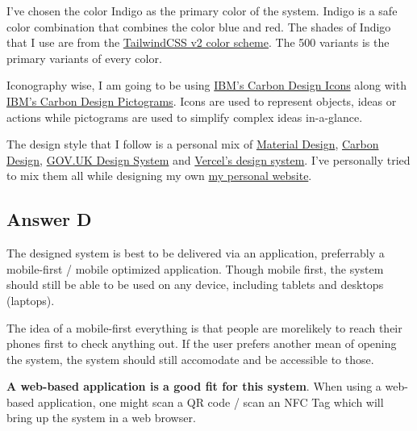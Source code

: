 \documentclass[
  11pt, %
]{assignment}
\begin{document}
I've chosen the color Indigo as the primary color of the system. Indigo is a safe color combination that combines the color blue and red. The shades of Indigo that I use are from the \href{https://tailwindcss.com/docs/customizing-colors}{TailwindCSS v2 color scheme}. The 500 variants is the primary variants of every color.

Iconography wise, I am going to be using \href{https://www.carbondesignsystem.com/guidelines/icons/library/}{IBM's Carbon Design Icons} along with \href{https://www.carbondesignsystem.com/guidelines/pictograms/library/}{IBM's Carbon Design Pictograms}. Icons are used to represent objects, ideas or actions while pictograms are used to simplify complex ideas in-a-glance.

The design style that I follow is a personal mix of \href{https://material.io}{Material Design}, \href{https://carbondesignsystem.com}{Carbon Design}, \href{https://design-system.service.gov.uk/}{GOV.UK Design System} and \href{https://vercel.com/design}{Vercel's design system}. I've personally tried to mix them all while designing my own \href{https://angy.gay}{my personal website}.

\subsection*{Answer D}

The designed system is best to be delivered via an application, preferrably a mobile-first / mobile optimized application. Though mobile first, the system should still be able to be used on any device, including tablets and desktops (laptops).

The idea of a mobile-first everything is that people are morelikely to reach their phones first to check anything out. If the user prefers another mean of opening the system, the system should still accomodate and be accessible to those.

\textbf{A web-based application is a good fit for this system}. When using a web-based application, one might scan a QR code / scan an NFC Tag which will bring up the system in a web browser.
\end{document}
